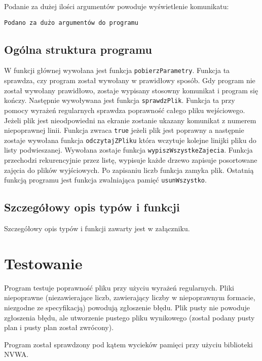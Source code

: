 \documentclass[12pt,a4paper,twoside]{article}
\let\oldmarginpar\marginpar
\renewcommand\marginpar[1]{%
  {\linespread{0.85}\normalfont\scriptsize%
\oldmarginpar[\hspace{1cm}\begin{minipage}{3cm}\raggedleft\scriptsize\color{black}\textsf{#1}\end{minipage}]%
{\hspace{0cm}\begin{minipage}{3cm}\raggedright\scriptsize\color{black}\textsf{#1}\end{minipage}}%
}%
}
\begin{document}
Podanie za dużej ilości argumentów powoduje wyświetlenie komunikatu:
\begin{verbatim}
Podano za dużo argumentów do programu
\end{verbatim}




\subsection{Ogólna struktura programu}
\marginpar{}
W funkcji głównej wywołana jest funkcja \lstinline|pobierzParametry|.
Funkcja ta sprawdza, czy program został wywołany w prawidłowy sposób. Gdy program nie został wywołany prawidłowo, zostaje wypisany stosowny komunikat i program się kończy.
Następnie wywoływana jest funkcja \lstinline|sprawdzPlik|.
Funkcja ta przy pomocy wyrażeń regularnych sprawdza poprawność całego pliku wejściowego. Jeżeli plik jest nieodpowiedni na ekranie zostanie ukazany komunikat z numerem niepoprawnej linii.
Funkcja zwraca \texttt{true} jeżeli plik jest poprawny a następnie zostaje wywołana funkcja \lstinline|odczytajZPliku| która wczytuje kolejne linijki pliku do listy podwieszanej.
Wywołana zostaje funkcja \lstinline|wypiszWszystkeZajecia|.
Funkcja przechodzi rekurencyjnie przez listę, wypisuje każde drzewo zapisuje posortowane zajęcia do plików wyjściowych. Po zapisaniu liczb funkcja zamyka plik. 
Ostatnią funkcją programu jest funkcja zwalniająca pamięć \lstinline|usunWszystko|.


\subsection{Szczegółowy opis typów i funkcji}

Szczegółowy opis typów i funkcji zawarty jest w załączniku.

 

\section{Testowanie}
\marginpar{}
Program testuje poprawność pliku przy użyciu wyrażeń regularnych. Pliki niepoprawne (niezawierające liczb, zawierający liczby w niepoprawnym formacie, niezgodne ze specyfikacją) powodują zgłoszenie błędu. Plik pusty nie powoduje zgłoszenia błędu, ale utworzenie pustego pliku wynikowego (został podany pusty plan i pusty plan został zwrócony).

Program został sprawdzony pod kątem wycieków pamięci przy użyciu biblioteki NVWA.
\end{document}
